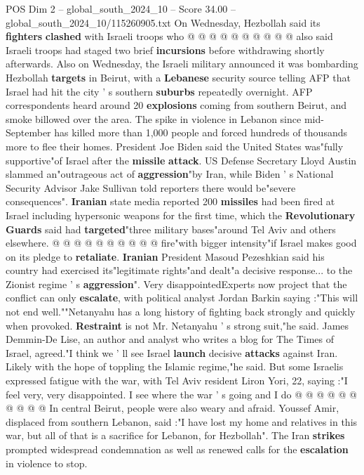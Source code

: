 \begin{textsample}{POS Dim 2 – global\_south\_2024\_10 – Score 34.00 – global\_south\_2024\_10/115260905.txt}
On Wednesday, Hezbollah said its \textbf{fighters} \textbf{clashed} with Israeli troops who @ @ @ @ @ @ @ @ @ @ also said Israeli troops had staged two brief \textbf{incursions} before withdrawing shortly afterwards.
Also on Wednesday, the Israeli military announced it was bombarding Hezbollah \textbf{targets} in Beirut, with a \textbf{Lebanese} security source telling AFP that Israel had hit the city ' s southern \textbf{suburbs} repeatedly overnight.
AFP correspondents heard around 20 \textbf{explosions} coming from southern Beirut, and smoke billowed over the area.
The spike in violence in Lebanon since mid-September has killed more than 1,000 people and forced hundreds of thousands more to flee their homes.
President Joe Biden said the United States was"fully supportive"of Israel after the \textbf{missile} \textbf{attack}.
US Defense Secretary Lloyd Austin slammed an"outrageous act of \textbf{aggression}"by Iran, while Biden ' s National Security Advisor Jake Sullivan told reporters there would be"severe consequences". \textbf{Iranian} state media reported 200 \textbf{missiles} had been fired at Israel including hypersonic weapons for the first time, which the \textbf{Revolutionary} \textbf{Guards} said had \textbf{targeted}"three military bases"around Tel Aviv and others elsewhere. @ @ @ @ @ @ @ @ @ @ fire"with bigger intensity"if Israel makes good on its pledge to \textbf{retaliate}. \textbf{Iranian} President Masoud Pezeshkian said his country had exercised its"legitimate rights"and dealt"a decisive response... to the Zionist regime ' s \textbf{aggression}".
Very disappointedExperts now project that the conflict can only \textbf{escalate}, with political analyst Jordan Barkin saying :"This will not end well.""Netanyahu has a long history of fighting back strongly and quickly when provoked. \textbf{Restraint} is not Mr.
Netanyahu ' s strong suit,"he said.
James Demmin-De Lise, an author and analyst who writes a blog for The Times of Israel, agreed."I think we ' ll see Israel \textbf{launch} decisive \textbf{attacks} against Iran.
Likely with the hope of toppling the Islamic regime,"he said.
But some Israelis expressed fatigue with the war, with Tel Aviv resident Liron Yori, 22, saying :"I feel very, very disappointed.
I see where the war ' s going and I do @ @ @ @ @ @ @ @ @ @ In central Beirut, people were also weary and afraid.
Youssef Amir, displaced from southern Lebanon, said :"I have lost my home and relatives in this war, but all of that is a sacrifice for Lebanon, for Hezbollah".
The Iran \textbf{strikes} prompted widespread condemnation as well as renewed calls for the \textbf{escalation} in violence to stop.

\end{textsample}
